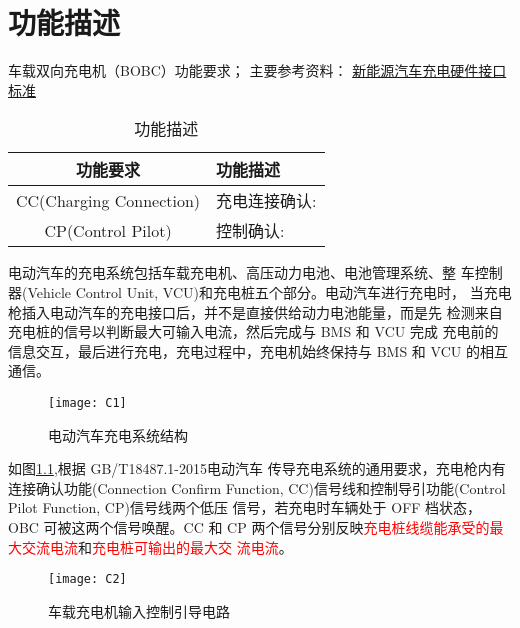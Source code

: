
\chapter{功能描述}

车载双向充电机（BOBC）功能要求；
主要参考资料：
\href{https://blog.csdn.net/hadywell/article/details/128699869?utm_medium=distribute.pc_relevant.none-task-blog-2~default~baidujs_utm_term~default-5-128699869-blog-112810903.235^v43^control&spm=1001.2101.3001.4242.4&utm_relevant_index=8}{新能源汽车充电硬件接口标准}

\begin{table}[h]
    \centering
    \caption{功能描述}
    \renewcommand{\arraystretch}{1.3}
    \begin{tabular}{|c|l|}
        \hline
        \cellcolor{yellow} 功能要求 & \cellcolor{yellow}功能描述\\
        \hline
        CC(Charging Connection)&充电连接确认:\\
        \hline
        CP(Control Pilot)&控制确认:\\
        \hline
    \end{tabular}
\end{table}


电动汽车的充电系统包括车载充电机、高压动力电池、电池管理系统、整
车控制器(Vehicle Control Unit, VCU)和充电桩五个部分。电动汽车进行充电时，
当充电枪插入电动汽车的充电接口后，并不是直接供给动力电池能量，而是先
检测来自充电桩的信号以判断最大可输入电流，然后完成与 BMS 和 VCU 完成
充电前的信息交互，最后进行充电，充电过程中，充电机始终保持与 BMS 和
VCU 的相互通信。
    \begin{figure}[!htbp]
        \centering
        \texttt{[image: C1]}
        \caption{电动汽车充电系统结构}
        \label{fig:C1}
    \end{figure}

如图\ref{fig:C1},根据 GB/T18487.1-2015\cite{GB18487}电动汽车
传导充电系统的通用要求，充电枪内有连接确认功能(Connection Confirm
Function, CC)信号线和控制导引功能(Control Pilot Function, CP)信号线两个低压
信号，若充电时车辆处于 OFF 档状态，OBC 可被这两个信号唤醒。CC 和 CP
两个信号分别反映\textcolor{red}{充电桩线缆能承受的最大交流电流}和\textcolor{red}{充电桩可输出的最大交
流电流}。

    \begin{figure}[!htbp]
        \centering
        \texttt{[image: C2]}
        \caption{车载充电机输入控制引导电路}
        \label{fig:C2}
    \end{figure}




